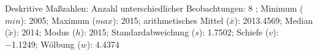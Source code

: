                     \begin{noten}
                	    \note{} Deskritive Maßzahlen:
                	    Anzahl unterschiedlicher Beobachtungen: 8%
                	    ; 
                	      Minimum ($min$): 2005; 
                	      Maximum ($max$): 2015; 
                	      arithmetisches Mittel ($\bar{x}$): \num[round-mode=places,round-precision=2]{2013,4569}; 
                	      Median ($\tilde{x}$): 2014; 
                	      Modus ($h$): 2015; 
                	      Standardabweichung ($s$): \num[round-mode=places,round-precision=2]{1,7502}; 
                	      Schiefe ($v$): \num[round-mode=places,round-precision=2]{-1,1249}; 
                	      Wölbung ($w$): \num[round-mode=places,round-precision=2]{4,4374}
                     \end{noten}


